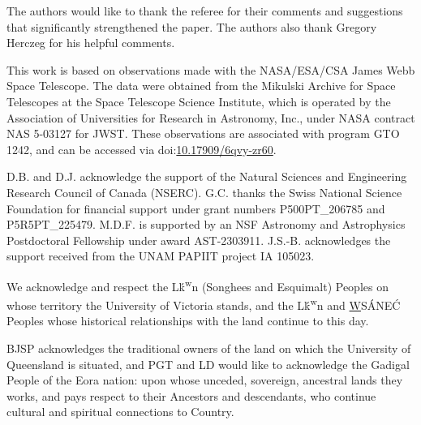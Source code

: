 \documentclass[11pt,twocolumn,twocolappendix]{aastex631}
\begin{document}
{The authors would like to thank the referee for their comments and suggestions that significantly strengthened the paper. The authors also thank Gregory Herczeg for his helpful comments.} 

This work is based on observations made with the NASA/ESA/CSA James Webb Space Telescope. The data were obtained from the Mikulski Archive for Space Telescopes at the Space Telescope Science Institute, which is operated by the Association of Universities for Research in Astronomy, Inc., under NASA contract NAS 5-03127 for JWST. These observations are associated with program GTO 1242, and can be accessed via doi:\href{https://doi.org/10.17909/6qvy-zr60}{10.17909/6qvy-zr60}.

D.B. and D.J. acknowledge the support of the Natural Sciences and Engineering Research Council of Canada (NSERC). G.C. thanks the Swiss National Science Foundation for financial support under grant numbers P500PT\_206785 and P5R5PT\_225479. M.D.F. is supported by an NSF Astronomy and Astrophysics Postdoctoral Fellowship under award AST-2303911. J.S.-B. acknowledges the support received from the UNAM PAPIIT project IA 105023.

We acknowledge and respect the L\textschwa\'{k}\textsuperscript{w}\textschwa\textipa{\ng}\textschwa n (Songhees and Esquimalt) Peoples on whose territory the University of Victoria stands, and the L\textschwa\'{k}\textsuperscript{w}\textschwa\textipa{\ng}\textschwa n and \underline{W}SÁNEĆ Peoples whose historical relationships with the land continue to this day.

BJSP acknowledges the traditional owners of the land on which the University of Queensland is situated, and PGT and LD would like to acknowledge the Gadigal People of the Eora nation: upon whose unceded, sovereign, ancestral lands they works, and pays respect to their Ancestors and descendants, who continue cultural and spiritual connections to Country.


\noindent 


{}

\end{document}
